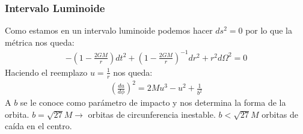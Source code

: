 \documentclass{beamer}
\begin{document}


\begin{frame}
\frametitle{Intervalo Luminoide}
Como estamos en un intervalo luminoide podemos hacer $ ds^2 = 0  $ por lo que la métrica nos queda: 
\begin{gather*}
  - \left(1 - \frac{2GM }{r }\right)dt^2 + \left(1 - \frac{2GM }{r}\right) ^ {-1 } dr^2 + r^2 d \Omega^2 = 0 
\end{gather*}
Haciendo el reemplazo $ u = \frac{1}{r} $ nos queda: 
\begin{gather*}
  \left(\frac{d u  }{d \phi }\right)^2 = 2M u^3 - u^2 + \frac{1}{b^2 } 
\end{gather*}
A $ b  $ se le conoce como parámetro de impacto y nos determina la forma de la orbita. $ b = \sqrt{27 } M  \rightarrow $ orbitas de circunferencia inestable. $ b < \sqrt{27 } M  $ orbitas de caída en el centro.
\end{frame}
\end{document}
